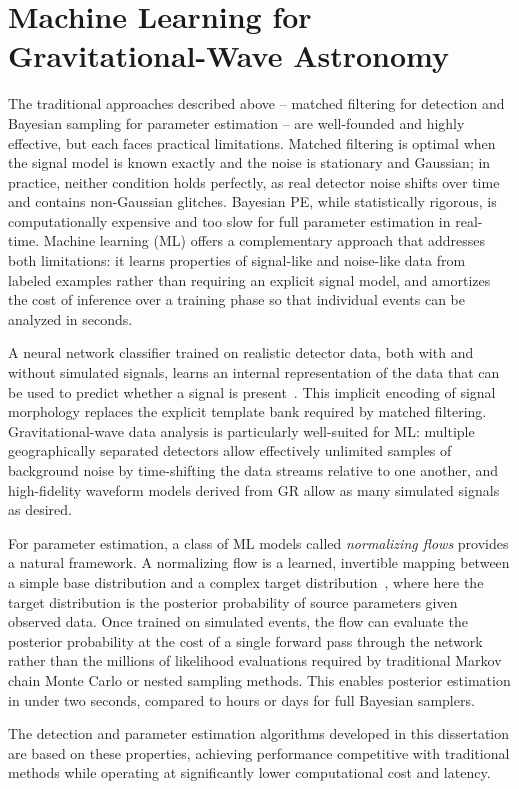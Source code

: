 \section{Machine Learning for Gravitational-Wave Astronomy}
\label{intro_sec:ml}

The traditional approaches described above -- matched filtering for detection and Bayesian sampling for parameter estimation -- are well-founded and highly effective, but each faces practical limitations.
Matched filtering is optimal when the signal model is known exactly and the noise is stationary and Gaussian; in practice, neither condition holds perfectly, as real detector noise shifts over time and contains non-Gaussian glitches.
Bayesian PE, while statistically rigorous, is computationally expensive and too slow for full parameter estimation in real-time.
Machine learning (ML) offers a complementary approach that addresses both limitations: it learns properties of signal-like and noise-like data from labeled examples rather than requiring an explicit signal model, and amortizes the cost of inference over a training phase so that individual events can be analyzed in seconds.

A neural network classifier trained on realistic detector data, both with and without simulated signals, learns an internal representation of the data that can be used to predict whether a signal is present~\cite{PhysRevLett.120.141103}.
This implicit encoding of signal morphology replaces the explicit template bank required by matched filtering.
Gravitational-wave data analysis is particularly well-suited for ML: multiple geographically separated detectors allow effectively unlimited samples of background noise by time-shifting the data streams relative to one another, and high-fidelity waveform models derived from GR allow as many simulated signals as desired.

For parameter estimation, a class of ML models called \emph{normalizing flows} provides a natural framework.
A normalizing flow is a learned, invertible mapping between a simple base distribution and a complex target distribution~\cite{papamakarios2021normalizing}, where here the target distribution is the posterior probability of source parameters given observed data.
Once trained on simulated events, the flow can evaluate the posterior probability at the cost of a single forward pass through the network rather than the millions of likelihood evaluations required by traditional Markov chain Monte Carlo or nested sampling methods.
This enables posterior estimation in under two seconds, compared to hours or days for full Bayesian samplers.

The detection and parameter estimation algorithms developed in this dissertation are based on these properties, achieving performance competitive with traditional methods while operating at significantly lower computational cost and latency.

